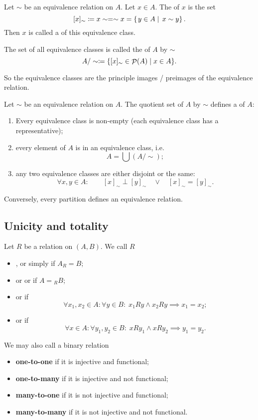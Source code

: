 \begin{definition}
Let $\sim$ be an equivalence relation on $A$. Let $x\in A$. The  of $x$ is the set
\[ [x]_\sim \coloneqq x\sim = \sim x = \left\{\left. y\in A \;\right|\; x\sim y \right\}. \]
Then $x$ is called a  of this equivalence class.

The set of all equivalence classes is called the  of $A$ by $\sim$
\[ A/\sim \coloneqq \{ [x]_\sim \in \mathop{\mathcal{P}}(A) \;|\; x\in A \}. \]
\end{definition}
So the equivalence classes are the principle images / preimages of the equivalence relation.

\begin{proposition}
Let $\sim$ be an equivalence relation on $A$. The quotient set of $A$ by $\sim$ defines a  of $A$:
\begin{enumerate}
\item Every equivalence class is non-empty (each equivalence class has a representative);
\item every element of $A$ is in an equivalence class, i.e.
\[ A = \bigcup (A/\sim); \]
\item any two equivalence classes are either disjoint or the same:
\[ \forall x,y\in A: \qquad[x]_\sim \perp [y]_\sim \quad \lor \quad [x]_\sim = [y]_\sim. \]
\end{enumerate}
Conversely, every partition defines an equivalence relation.
\end{proposition}

\subsection{Unicity and totality}
\begin{definition}
Let $R$ be a relation on $(A, B)$. We call $R$
\begin{itemize}
\item {},  or simply  if $A_R = B$;
\item {} or  or  if $A = {_RB}$;
\item {} or  if
\[ \forall x_1,x_2\in A: \forall y\in B: \; x_1Ry \land x_2Ry \implies x_1=x_2; \]
\item {} or  if
\[ \forall x\in A: \forall y_1,y_2\in B: \; xRy_1 \land xRy_2 \implies y_1=y_2. \]
\end{itemize}
We may also call a binary relation
\begin{itemize}
\item \textbf{one-to-one} if it is injective and functional;
\item \textbf{one-to-many} if it is injective and not functional;
\item \textbf{many-to-one} if it is not injective and functional;
\item \textbf{many-to-many} if it is not injective and not functional.
\end{itemize}
\end{definition}

